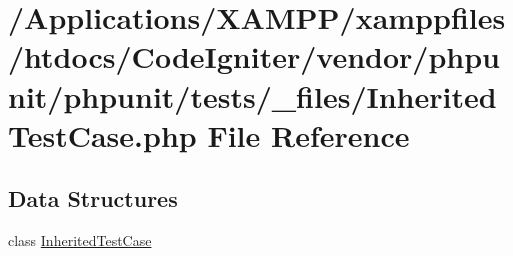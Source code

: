 \hypertarget{_inherited_test_case_8php}{}\section{/\+Applications/\+X\+A\+M\+P\+P/xamppfiles/htdocs/\+Code\+Igniter/vendor/phpunit/phpunit/tests/\+\_\+files/\+Inherited\+Test\+Case.php File Reference}
\label{_inherited_test_case_8php}
\subsection*{Data Structures}
\begin{DoxyCompactItemize}
\item 
class \mbox{\hyperlink{class_inherited_test_case}{Inherited\+Test\+Case}}
\end{DoxyCompactItemize}
